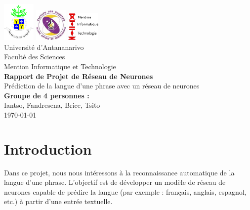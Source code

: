 \documentclass[a4paper,12pt]{report}
\begin{document}
\begin{titlepage}
    \centering
    \includegraphics[width=0.12\textwidth]{univ.png}\hspace{1cm}
    \includegraphics[width=0.12\textwidth]{fac.jpg}\hspace{1cm}
    \includegraphics[width=0.12\textwidth]{IT.jpg}\\[1.5cm]

    {\large Université d'Antananarivo \\ 
    Faculté des Sciences \\ [0.1cm]
    Mention Informatique et Technologie}\\[1.5cm]

    {\Huge \bfseries Rapport de Projet de Réseau de Neurones}\\[0.5cm]
    {\large Prédiction de la langue d'une phrase avec un réseau de neurones}\\[2cm]

    \textbf{Groupe de 4 personnes :}\\
    Iantso, Fandresena, Brice, Tsito\\[1cm]

    {\large \today}
\end{titlepage}

\tableofcontents
\newpage

\chapter*{Introduction}
Dans ce projet, nous nous intéressons à la reconnaissance automatique de la langue d'une phrase.
L'objectif est de développer un modèle de réseau de neurones capable de prédire la langue (par exemple : français, anglais, espagnol, etc.) à partir d'une entrée textuelle.
\end{document}
